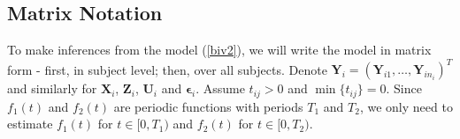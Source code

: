 \documentclass[12pt, notitlepage]{article}
\begin{document}
\subsection{Matrix Notation} \label{MatrixNotation}

To make inferences from the model (\ref{biv2}), we will  write the model in matrix form -  first, in subject level; then, over all subjects.  
Denote $\bm Y_{i} = (\bm Y_{i1}, \dots, \bm Y_{in_i})^T$ and similarly for $\bm X_i$, $\bm Z_i$, $\bm U_i$ and $\bm \epsilon_i$. 
Assume $t_{ij} > 0$ and $ \min \{t_{ij}\} = 0$. 
Since  $f_1(t)$ and $f_2(t)$ are  periodic functions with periods $T_1$ and $T_2$, we only need to estimate $f_1(t)$ for $t \in [0, T_1)$ and $f_2(t)$ for $t \in [0, T_2)$. 
\end{document}
